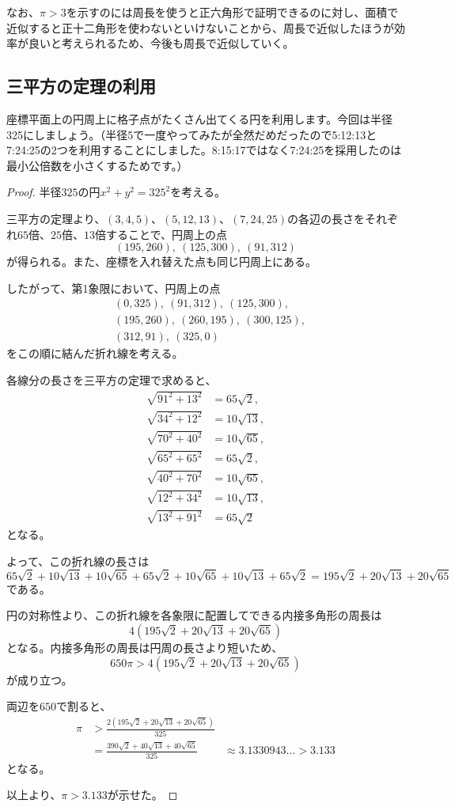 \documentclass[dvipdfmx]{jlreq}
\begin{document}
なお、$\pi>3$を示すのには周長を使うと正六角形で証明できるのに対し、面積で近似すると正十二角形を使わないといけないことから、周長で近似したほうが効率が良いと考えられるため、今後も周長で近似していく。
\subsection{三平方の定理の利用}
座標平面上の円周上に格子点がたくさん出てくる円を利用します。今回は半径325にしましょう。（半径5で一度やってみたが全然だめだったので5:12:13と7:24:25の2つを利用することにしました。8:15:17ではなく7:24:25を採用したのは最小公倍数を小さくするためです。）
\begin{proof}
半径$325$の円$x^2+y^2=325^2$を考える。

三平方の定理より、$(3,4,5)$、$(5,12,13)$、$(7,24,25)$の各辺の長さをそれぞれ$65$倍、$25$倍、$13$倍することで、円周上の点
\[
(195,260),\ (125,300),\ (91,312)
\]
が得られる。また、座標を入れ替えた点も同じ円周上にある。

したがって、第1象限において、円周上の点
\[
\begin{aligned}
&(0,325),\ (91,312),\ (125,300),\\
&(195,260),\ (260,195),\ (300,125),\\
&(312,91),\ (325,0)
\end{aligned}
\]
をこの順に結んだ折れ線を考える。

各線分の長さを三平方の定理で求めると、
\[
\begin{aligned}
\sqrt{91^2+13^2}&=65\sqrt{2},\\
\sqrt{34^2+12^2}&=10\sqrt{13},\\
\sqrt{70^2+40^2}&=10\sqrt{65},\\
\sqrt{65^2+65^2}&=65\sqrt{2},\\
\sqrt{40^2+70^2}&=10\sqrt{65},\\
\sqrt{12^2+34^2}&=10\sqrt{13},\\
\sqrt{13^2+91^2}&=65\sqrt{2}
\end{aligned}
\]
となる。

よって、この折れ線の長さは
\[
65\sqrt{2}+10\sqrt{13}+10\sqrt{65}+65\sqrt{2}+10\sqrt{65}+10\sqrt{13}+65\sqrt{2}
=195\sqrt{2}+20\sqrt{13}+20\sqrt{65}
\]
である。

円の対称性より、この折れ線を各象限に配置してできる内接多角形の周長は
\[
4(195\sqrt{2}+20\sqrt{13}+20\sqrt{65})
\]
となる。内接多角形の周長は円周の長さより短いため、
\[
650\pi>4(195\sqrt{2}+20\sqrt{13}+20\sqrt{65})
\]
が成り立つ。

両辺を$650$で割ると、
\[
\begin{aligned}
\pi
&>\frac{2(195\sqrt{2}+20\sqrt{13}+20\sqrt{65})}{325}\\
&=\frac{390\sqrt{2}+40\sqrt{13}+40\sqrt{65}}{325}\
&\approx3.1330943\dots>3.133
\end{aligned}
\]
となる。

以上より、$\pi>3.133$が示せた。
\end{proof}
\end{document}

